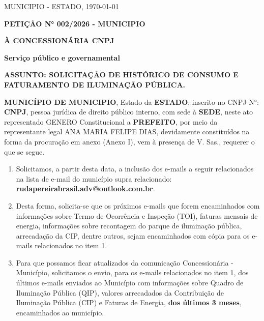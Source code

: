 \documentclass[12pt,a4paper]{article}
\newcommand{\Municipio}{MUNICIPIO}
\newcommand{\Estado}{ESTADO}
\newcommand{\CNPJ}{CNPJ}
\newcommand{\Sede}{SEDE}
\newcommand{\GeneroCargo}{GENERO}
\newcommand{\PrefeitoNome}{PREFEITO}
\newcommand{\Concessionaria}{CONCESSIONÁRIA}
\newcommand{\CNPJCON}{CNPJ}
\begin{document}
\begin{flushright}
\small \Municipio{} - \Estado{}, \today
\end{flushright}

\textbf{PETIÇÃO N° 002/2026 - \Municipio{}}

\textbf{À \Concessionaria{} \CNPJCON{}}

\textbf{Serviço público e governamental}

\vspace{0,25cm}

\textbf{ASSUNTO: SOLICITAÇÃO DE HISTÓRICO DE CONSUMO E FATURAMENTO DE ILUMINAÇÃO PÚBLICA.}

\vspace{0,25cm}

\textbf{MUNICÍPIO DE \Municipio{}}, Estado da \textbf{\Estado{}}, inscrito no CNPJ N°: \textbf{\CNPJ{}}, pessoa jurídica de direito público interno, com sede à \textbf{\Sede{}}, neste ato representado \GeneroCargo{} Constitucional a \textbf{\PrefeitoNome{}}, por meio da representante legal ANA MARIA FELIPE DIAS, devidamente constituídos na forma da procuração em anexo (Anexo I), vem à presença de V. Sas., requerer o que se segue.

\begin{enumerate}
\item
  Solicitamos, a partir desta data, a inclusão dos e-mails a seguir relacionados na lista de e-mail do município supra relacionado: \textbf{rudapereirabrasil.adv@outlook.com.br}.
\item
  Desta forma, solicita-se que os próximos e-mails que forem encaminhados com informações sobre Termo de Ocorrência e Inspeção (TOI), faturas mensais de energia, informações sobre recontagem do parque de iluminação pública, arrecadação da CIP, dentre outros, sejam encaminhados com cópia para os e-mails relacionados no item 1.
\item
  Para que possamos ficar atualizados da comunicação Concessionária - Município, solicitamos o envio, para os e-mails relacionados no item 1, dos últimos e-mails enviados ao Município com informações sobre Quadro de Iluminação Pública (QIP), valores arrecadados da Contribuição de Iluminação Pública (CIP) e Faturas de Energia,
  \textbf{dos últimos 3 meses}, encaminhados ao município.
\end{enumerate}
\end{document}
